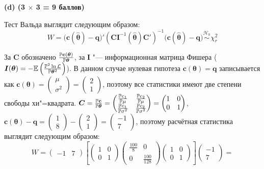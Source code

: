 \documentclass[pdftex,11pt,openany]{book}\usepackage[]{graphicx}\usepackage[]{color}
\newcommand{\calL}{\mathcal{L}}
\newcommand{\bs}[1]{\boldsymbol{#1}}
\newcommand{\hypo}{\mathcal{H}}
\newcommand{\simhypo}{\ensuremath{\mathrel{\stackrel{\hypo_0}{\sim}}}}
\begin{document}
\begin{solution}
\par\smallskip

\textbf{(d) (3 $\times$ 3 = 9 баллов)}

Тест Вальда  выглядит следующим образом:
\[
W = \bigl(\mathbf{c}(\bs{\hat\theta}) - \bs{q}\bigr)' (\bs{C} \bs{I}^{-1}(\bs{\hat\theta}) \bs{C}')^{-1} \bigl(\mathbf{c}(\bs{\hat\theta}) - \bs{q} \bigr) \simhypo \chi^2_{r}
\]

За $\bs{C}$ обозначено $\frac{\p \mathbf{c}(\bs\theta)}{\p \bs\theta}$, за $\bs{I}$ "--- информационная матрица Фишера ($\bs{I}(\bs\theta) = -\E\left( \frac{\p^2 \ln \calL}{\p \bs\theta^2} \right)$). В данном случае нулевая гипотеза $\mathbf{c}(\bs\theta) = \bs{q}$ записывается как $\mathbf{c}({\bs{\theta}}) = \begin{pmatrix} \mu \\ \sigma^2 \end{pmatrix} = \begin{pmatrix} 2 \\ 1 \end{pmatrix}$, поэтому все статистики имеют две степени свободы хи"=квадрата. $\bs{C} = \frac{\p  \mathbf{c}}{\p \bs\theta} = \begin{pmatrix} \frac{\p  c_1}{\p \mu} & \frac{\p  c_2}{\p \mu} \\ \frac{\p  c_1}{\p \sigma^2} & \frac{\p  c_2}{\p \sigma^2} \end{pmatrix} =  \begin{pmatrix} 1 & 0 \\ 0 & 1 \end{pmatrix}$, $\mathbf{c}(\bs\theta) - \bs{q}  = \begin{pmatrix} 1 \\ 8 \end{pmatrix} - \begin{pmatrix} 2 \\ 1 \end{pmatrix} = \begin{pmatrix} -1 \\ 7 \end{pmatrix}$, поэтому расчётная статистика выглядит следующим образом:
\[
W = \begin{pmatrix} -1 & 7 \end{pmatrix} \left[ \begin{pmatrix} 1 & 0 \\ 0 & 1 \end{pmatrix} \begin{pmatrix} \frac{100}{8} & 0 \\ 0 & \frac{100}{128}  \end{pmatrix} \begin{pmatrix} 1 & 0 \\ 0 & 1 \end{pmatrix} \right] \begin{pmatrix} -1  \\  7 \end{pmatrix} =
\]
\end{solution}
\end{document}

